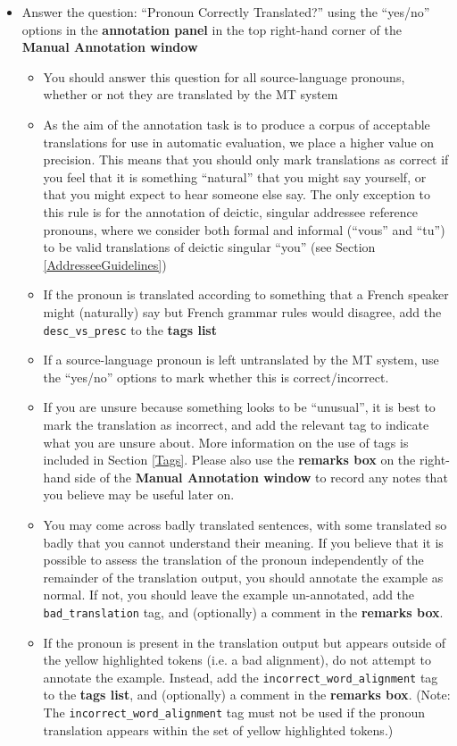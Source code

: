 \documentclass[11pt]{article} %
\newcommand\tag[1]{\texttt{#1}}
\begin{document}
\begin{itemize}
  \item Answer the question: ``Pronoun Correctly Translated?'' using the ``yes/no'' options in the \textbf{annotation panel} in the top right-hand corner of the \textbf{Manual Annotation window}
  \begin{itemize}
    \item You should answer this question for all source-language pronouns, whether or not they are translated by the MT system
    \item As the aim of the annotation task is to produce a corpus of acceptable translations for use in automatic evaluation, we place a higher value on precision. This means that you should only mark translations as correct if you feel that it is something ``natural'' that you might say yourself, or that you might expect to hear someone else say. The only exception to this rule is for the annotation of deictic, singular addressee reference pronouns, where we consider both formal and informal (``vous'' and ``tu'') to be valid translations of deictic singular ``you'' (see Section \ref{AddresseeGuidelines})
    \item If the pronoun is translated according to something that a French speaker might (naturally) say but French grammar rules would disagree, add the \tag{desc\_vs\_presc} to the \textbf{tags list}
    \item If a source-language pronoun is left untranslated by the MT system, use the ``yes/no'' options to mark whether this is correct/incorrect.
    \item If you are unsure because something looks to be ``unusual'', it is best to mark the translation as incorrect, and add the relevant tag to indicate what you are unsure about. More information on the use of tags is included in Section \ref{Tags}. Please also use the \textbf{remarks box} on the right-hand side of the \textbf{Manual Annotation window} to record any notes that you believe may be useful later on.
    \item You may come across badly translated sentences, with some translated so badly that you cannot understand their meaning. If you believe that it is possible to assess the translation of the pronoun independently of the remainder of the translation output, you should annotate the example as normal. If not, you should leave the example un-annotated, add the \tag{bad\_translation} tag, and (optionally) a comment in the \textbf{remarks box}.
    \item If the pronoun is present in the translation output but appears outside of the yellow highlighted tokens (i.e. a bad alignment), do not attempt to annotate the example. Instead, add the \tag{incorrect\_word\_alignment} tag to the \textbf{tags list}, and (optionally) a comment in the \textbf{remarks box}. (Note: The \tag{incorrect\_word\_alignment} tag must not be used if the pronoun translation appears within the set of yellow highlighted tokens.)

\end{itemize}
\end{itemize}
\end{document}
